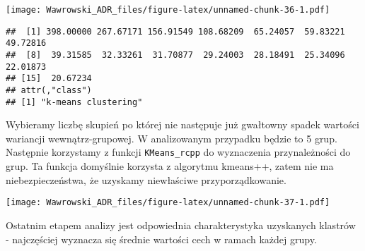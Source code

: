 \documentclass[]{book}
\newenvironment{Shaded}{\begin{snugshade}}{\end{snugshade}}
\newcommand{\KeywordTok}[1]{\textcolor[rgb]{0.13,0.29,0.53}{\textbf{#1}}}
\newcommand{\DataTypeTok}[1]{\textcolor[rgb]{0.13,0.29,0.53}{#1}}
\newcommand{\DecValTok}[1]{\textcolor[rgb]{0.00,0.00,0.81}{#1}}
\newcommand{\StringTok}[1]{\textcolor[rgb]{0.31,0.60,0.02}{#1}}
\newcommand{\OperatorTok}[1]{\textcolor[rgb]{0.81,0.36,0.00}{\textbf{#1}}}
\newcommand{\NormalTok}[1]{#1}
\begin{document}
\texttt{[image: Wawrowski\_ADR\_files/figure-latex/unnamed-chunk-36-1.pdf]}

\begin{verbatim}
##  [1] 398.00000 267.67171 156.91549 108.68209  65.24057  59.83221  49.72816
##  [8]  39.31585  32.33261  31.70877  29.24003  28.18491  25.34096  22.01873
## [15]  20.67234
## attr(,"class")
## [1] "k-means clustering"
\end{verbatim}

Wybieramy liczbę skupień po której nie następuje już gwałtowny spadek
wartości wariancji wewnątrz-grupowej. W analizowanym przypadku będzie to
5 grup. Następnie korzystamy z funkcji \texttt{KMeans\_rcpp} do
wyznaczenia przynależności do grup. Ta funkcja domyślnie korzysta z
algorytmu kmeans++, zatem nie ma niebezpieczeństwa, że uzyskamy
niewłaściwe przyporządkowanie.

\begin{Shaded}
\end{Shaded}

\texttt{[image: Wawrowski\_ADR\_files/figure-latex/unnamed-chunk-37-1.pdf]}

Ostatnim etapem analizy jest odpowiednia charakterystyka uzyskanych
klastrów - najczęściej wyznacza się średnie wartości cech w ramach
każdej grupy.

\begin{Shaded}
\end{Shaded}
\end{document}
